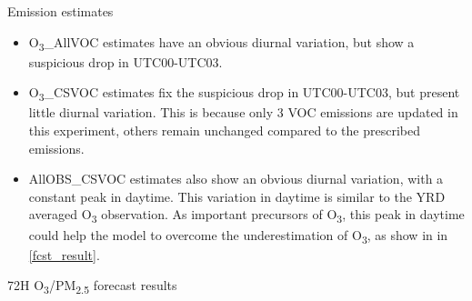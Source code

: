 \documentclass[final]{beamer}
\newlength{\colwidth}
\begin{document}
\begin{frame}[t]
\begin{columns}[t]
\begin{column}{\colwidth}
\begin{alertblock}{Emission estimates}
\begin{figure}
                    
                \end{figure}
                
                \begin{itemize}
                    \item O\textsubscript{3}\_AllVOC estimates have an obvious diurnal variation, but show a suspicious drop in UTC00-UTC03.
                    \item O\textsubscript{3}\_CSVOC estimates fix the suspicious drop in UTC00-UTC03, but present little diurnal variation. This is because only 3 VOC emissions are updated in this experiment, others remain unchanged compared to the prescribed emissions.
                    \item AllOBS\_CSVOC estimates also show an obvious diurnal variation, with a constant peak in daytime. This variation in daytime is similar to the YRD averaged O\textsubscript{3} observation. As important precursors of O\textsubscript{3}, this peak in daytime could help the model to overcome the underestimation  of O\textsubscript{3}, as show in in \cref{fcst_result}.
                \end{itemize}

			\end{alertblock}

			\begin{alertblock}{72H O\textsubscript{3}/PM\textsubscript{2.5} forecast results}


\end{alertblock}
\end{column}
\end{columns}
\end{frame}
\end{document}
